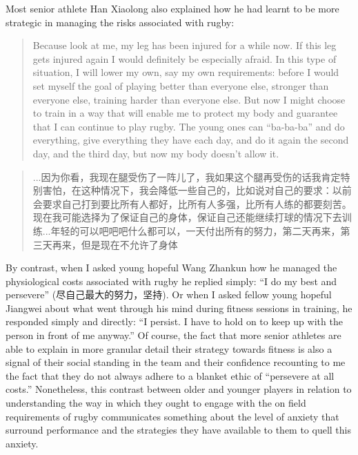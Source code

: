 \begin{CJK}{UTF8}{gbsn}
Most senior athlete Han Xiaolong also explained how he had learnt to be more strategic in managing the risks associated with rugby:

    \begin{quotation}
      Because look at me, my leg has been injured for a while now.  If this leg gets injured again I would definitely be especially afraid.  In this type of situation, I will lower my own, say my own requirements: before I would set myself the goal of playing better than everyone else, stronger than everyone else, training harder than everyone else.  But now I might choose to train in a way that will enable me to protect my body and guarantee that I can continue to play rugby.  The young ones can ``ba-ba-ba'' and do everything, give everything they have each day, and do it again the second day, and the third day, but now my body doesn't allow it.
    \end{quotation}

\begin{quotation}
      ...因为你看，我现在腿受伤了一阵儿了，我如果这个腿再受伤的话我肯定特别害怕，在这种情况下，我会降低一些自己的，比如说对自己的要求：以前会要求自己打到要比所有人都好，比所有人多强，比所有人练的都要刻苦。现在我可能选择为了保证自己的身体，保证自己还能继续打球的情况下去训练...年轻的可以吧吧吧什么都可以，一天付出所有的努力，第二天再来，第三天再来，但是现在不允许了身体
\end{quotation}

By contrast, when I asked young hopeful Wang Zhankun how he managed the physiological costs associated with rugby he replied simply: ``I do my best and persevere'' (尽自己最大的努力，坚持). Or when I asked fellow young hopeful Jiangwei about what went through his mind during fitness sessions in training, he responded simply and directly: ``I persist. I have to hold on to keep up with the person in front of me anyway.'' Of course, the fact that more senior athletes are able to explain in more granular detail their strategy towards fitness is also a signal of their social standing in the team and their confidence recounting to me the fact that they do not always adhere to a blanket ethic of ``persevere at all costs.''  Nonetheless, this contrast between older and younger players in relation to understanding the way in which they ought to engage with the on field requirements of rugby communicates something about the level of anxiety that surround performance and the strategies they have available to them to quell this anxiety.




\end{CJK}
